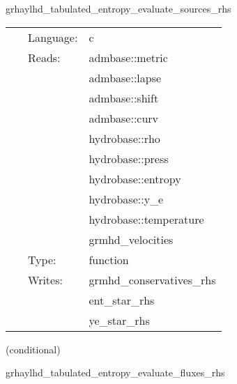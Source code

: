\hspace{5mm} grhaylhd\_tabulated\_entropy\_evaluate\_sources\_rhs 

\hspace{5mm}{\it entropy+tabulated version of grhaylhd\_evaluate\_sources\_rhs } 


\hspace{5mm}

 \begin{tabular*}{160mm}{cll} 
~ & Language:  & c \\ 
~ & Reads:  & admbase::metric \\ 
~& ~ &admbase::lapse\\ 
~& ~ &admbase::shift\\ 
~& ~ &admbase::curv\\ 
~& ~ &hydrobase::rho\\ 
~& ~ &hydrobase::press\\ 
~& ~ &hydrobase::entropy\\ 
~& ~ &hydrobase::y\_e\\ 
~& ~ &hydrobase::temperature\\ 
~& ~ &grmhd\_velocities\\ 
~ & Type:  & function \\ 
~ & Writes:  & grmhd\_conservatives\_rhs \\ 
~& ~ &ent\_star\_rhs\\ 
~& ~ &ye\_star\_rhs\\ 
\end{tabular*} 


\vspace{5mm}

   (conditional) 

\hspace{5mm} grhaylhd\_tabulated\_entropy\_evaluate\_fluxes\_rhs 

\hspace{5mm}{\it entropy+tabulated version of grhaylhd\_evaluate\_fluxes\_rhs } 


\hspace{5mm}

